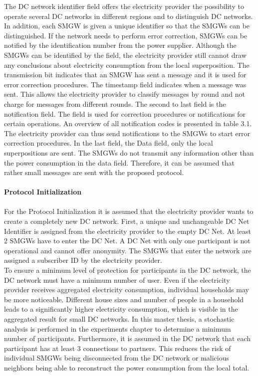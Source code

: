 The DC network identifier field offers the electricity provider the possibility to operate several DC networks in different regions and to distinguish DC networks. In addition, each SMGW is given a unique identifier so that the SMGWs can be distinguished. If the network needs to perform error correction, SMGWs can be notified by the identification number from the power supplier. Although the SMGWs can be identified by the field, the electricity provider still cannot draw any conclusions about electricity consumption from the local superposition. The transmission bit indicates that an SMGW has sent a message and it is used for error correction procedures. The timestamp field indicates when a message was sent. This allows the electricity provider to classify messages by round and not charge for messages from different rounds. The second to last field is the notification field. The field is used for correction procedures or notifications for certain operations. An overview of all notification codes is presented in table 3.1. The electricity provider can thus send notifications to the SMGWs to start error correction procedures. In the last field, the Data field, only the local superpositions are sent. The SMGWs do not transmit any information other than the power consumption in the data field. Therefore, it can be assumed that rather small messages are sent with the proposed protocol.\\
\\
\textbf{Protocol Initialization}
\\
\\
For the Protocol Initialization it is assumed that the electricity provider wants to create a completely new DC network. First, a unique and unchangeable DC Net Identifier is assigned from the electricity provider to the empty DC Net. At least 2 SMGWs have to enter the DC Net. A DC Net with only one participant is not operational and cannot offer anonymity. 
The SMGWs that enter the network are assigned a subscriber ID by the electricity provider.\\
To ensure a minimum level of protection for participants in the DC network, the DC network must have a minimum number of user. Even if the electricity provider receives aggregated electricity consumption, individual households may be more noticeable. Different house sizes and number of people in a household leads to a significantly higher electricity consumption, which is visible in the aggregated result for small DC networks. In this master thesis, a stochastic analysis is performed in the experiments chapter to determine a minimum number of participants. Furthermore, it is assumed in the DC network that each participant has at least 3 connections to partners. This reduces the risk of individual SMGWs being disconnected from the DC network or malicious neighbors being able to reconstruct the power consumption from the local total.\\

